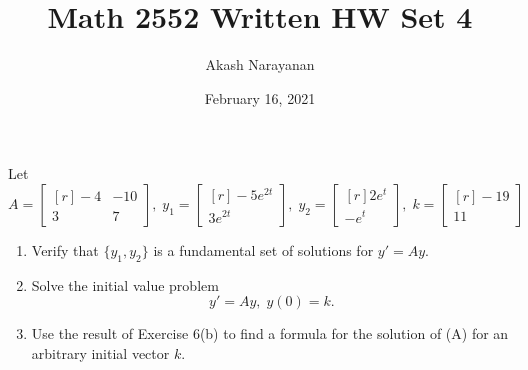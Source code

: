 \documentclass[11pt, titlepage]{article}
\title{Math 2552 Written HW Set 4}
\author{Akash Narayanan}
\date{February 16, 2021}
\begin{document}
  \maketitle

  \begin{problem}[Trench 10.3.9]
    Let
    \begin{equation*}
      A =
      \begin{bmatrix*}[r]
        -4 & -10 \\
        3 & 7
      \end{bmatrix*}, \;
      y_{1} =
      \begin{bmatrix*}[r]
        -5e^{2t} \\
        3e^{2t}
      \end{bmatrix*}, \;
      y_{2} =
      \begin{bmatrix*}[r]
        2e^{t} \\
        -e^{t}
      \end{bmatrix*}, \;
      k =
      \begin{bmatrix*}[r]
        -19 \\
        11
      \end{bmatrix*}
    \end{equation*}
    \begin{enumerate}[label={(\alph*)}]
      \item Verify that \(\{y_{1}, y_{2}\}\) is a fundamental set of solutions for \(y' = Ay\).
      \item Solve the initial value problem
      \begin{equation*}
        y' = A y, \; y(0) = k. \tag{A}
      \end{equation*}
      \item Use the result of Exercise 6(b) to find a formula for the solution of (A) for an arbitrary initial vector \(k\).
    \end{enumerate}
  \end{problem}
\end{document}
